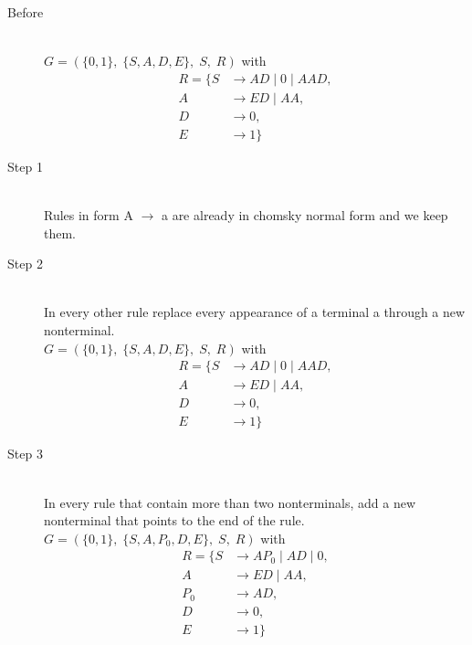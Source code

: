 \begin{description}
	\item[Before] \hfill \\ 
		$G=(\{	0, 1\},\;\{ S, A, D, E\},\;S,\;R)$ with
	\begin{align*}
		R=\{	S &\rightarrow AD\;|\;0\;|\;AAD, \\ 
		A &\rightarrow ED\;|\;AA, \\ 
		D &\rightarrow 0, \\ 
		E &\rightarrow 1\}
	\end{align*}
	\item[Step 1] \hfill \\ 
	Rules in form A  $\rightarrow$  a are already in chomsky normal form and we keep them.\\ 
		\item[Step 2] \hfill \\ 
	In every other rule replace every appearance of a terminal a through a new nonterminal.\\ 
	$G=(\{	0, 1\},\;\{ S, A, D, E\},\;S,\;R)$ with
	\begin{align*}
		R=\{	S &\rightarrow AD\;|\;0\;|\;AAD, \\ 
		A &\rightarrow ED\;|\;AA, \\ 
		D &\rightarrow 0, \\ 
		E &\rightarrow 1\}
	\end{align*}
	\item[Step 3] \hfill \\ 
	In every rule that contain more than two nonterminals, add a new nonterminal that points to the end of the rule.\\ 
	$G=(\{	0, 1\},\;\{ S, A, P_{0}, D, E\},\;S,\;R)$ with
	\begin{align*}
		R=\{	S &\rightarrow AP_{0} \;|\;AD\;|\;0, \\ 
		A &\rightarrow ED\;|\;AA, \\ 
		P_{0}  &\rightarrow AD, \\ 
		D &\rightarrow 0, \\ 
		E &\rightarrow 1\}
	\end{align*}
\end{description}